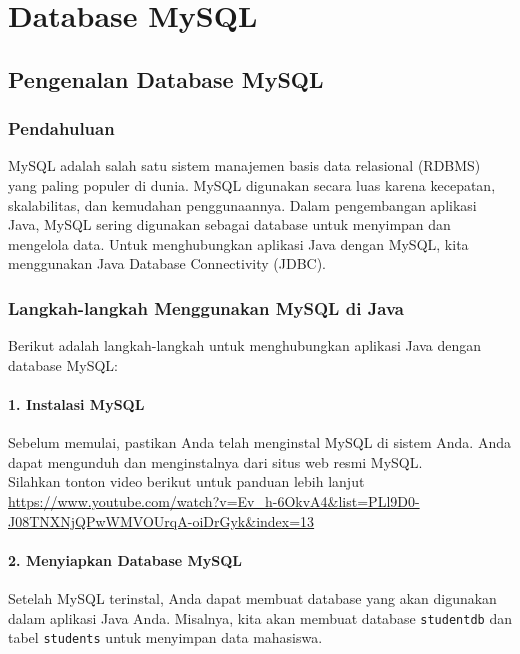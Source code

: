 \chapter{Database MySQL}

\section{Pengenalan Database MySQL}

\subsection{Pendahuluan}

MySQL adalah salah satu sistem manajemen basis data relasional (RDBMS) yang paling populer di dunia. MySQL digunakan secara luas karena kecepatan, skalabilitas, dan kemudahan penggunaannya. Dalam pengembangan aplikasi Java, MySQL sering digunakan sebagai database untuk menyimpan dan mengelola data. Untuk menghubungkan aplikasi Java dengan MySQL, kita menggunakan Java Database Connectivity (JDBC).

\subsection{Langkah-langkah Menggunakan MySQL di Java}

Berikut adalah langkah-langkah untuk menghubungkan aplikasi Java dengan database MySQL:

\subsubsection{1. Instalasi MySQL}

Sebelum memulai, pastikan Anda telah menginstal MySQL di sistem Anda. Anda dapat mengunduh dan menginstalnya dari situs web resmi MySQL.\\

Silahkan tonton video berikut untuk panduan lebih lanjut\\ \url{https://www.youtube.com/watch?v=Ev_h-6OkvA4&list=PLl9D0-J08TNXNjQPwWMVOUrqA-oiDrGyk&index=13}

\subsubsection{2. Menyiapkan Database MySQL}

Setelah MySQL terinstal, Anda dapat membuat database yang akan digunakan dalam aplikasi Java Anda. Misalnya, kita akan membuat database \texttt{studentdb} dan tabel \texttt{students} untuk menyimpan data mahasiswa. 

